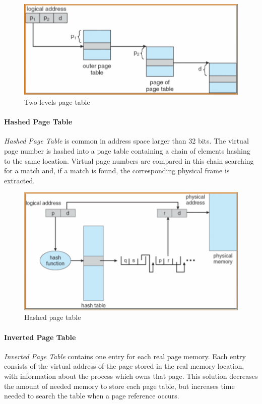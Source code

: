 \begin{figure}[hbtp]
\centering
\includegraphics[scale=0.4]{images/memory_management/two_levels_pagetable.jpg}
\caption{Two levels page table}
\end{figure}

\paragraph{Hashed Page Table}
\emph{Hashed Page Table} is common in address space larger than 32 bits. The virtual page number is hashed into a page table containing a chain of elements hashing to the same location. Virtual page numbers are compared in this chain searching for a match and, if a match is found, the corresponding physical frame is extracted.

\begin{figure}[hbtp]
\centering
\includegraphics[scale=0.4]{images/memory_management/hashed_pagetable.jpg}
\caption{Hashed page table}
\end{figure}

\paragraph{Inverted Page Table}
\emph{Inverted Page Table} contains one entry for each real page memory. Each entry consists of the virtual address of the page stored in the real memory location, with information about the process which owns that page. This solution decreases the amount of needed memory to store each page table, but increases time needed to search the table when a page reference occurs.

